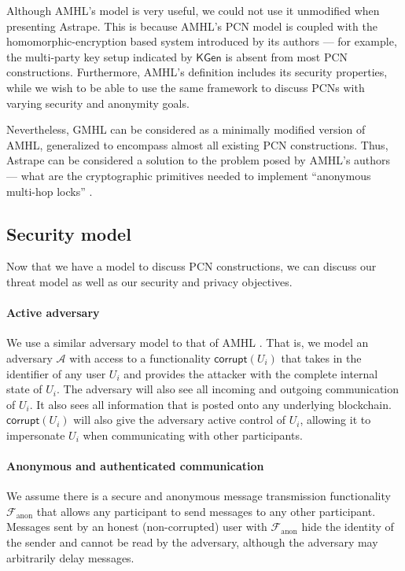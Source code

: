 \documentclass[USenglish,oneside,twocolumn]{article}
\begin{document}
Although AMHL's model is very useful, we could not use it unmodified when presenting Astrape. This is because AMHL's PCN model is coupled with the homomorphic-encryption based system introduced by its authors --- for example, the multi-party key setup indicated by $\mathsf{KGen}$ is absent from most PCN constructions. Furthermore, AMHL's definition includes its security properties, while we wish to be able to use the same framework to discuss PCNs with varying security and anonymity goals.

Nevertheless, GMHL can be considered as a minimally modified version of AMHL, generalized to encompass almost all existing PCN constructions. Thus, Astrape can be considered a solution to the problem posed by AMHL's authors --- what are the cryptographic primitives needed to implement ``anonymous multi-hop locks'' \cite{malavolta2019anonymous}.

\subsection{Security model}

Now that we have a model to discuss PCN constructions, we can discuss our threat model as well as our security and privacy objectives.


\paragraph*{Active adversary} We use a similar adversary model to that of AMHL \cite{malavolta2019anonymous}. That is, we model an adversary $\mathcal{A}$ with access to a functionality $\mathsf{corrupt}(U_i)$ that takes in the identifier of any user $U_i$ and provides the attacker with the complete internal state of $U_i$. The adversary will also see all incoming and outgoing communication of $U_i$. It also sees all information that is posted onto any underlying blockchain. $\mathsf{corrupt}(U_i)$ will also give the adversary active control of $U_i$, allowing it to impersonate $U_i$ when communicating with other participants.

\newcommand{\Fanon}{\mathcal{F}_\mathrm{anon}}

\paragraph*{Anonymous and authenticated communication} We assume there is a secure and anonymous message transmission functionality $\Fanon$ that allows any participant to send messages to any other participant. Messages sent by an honest (non-corrupted) user with $\Fanon$ hide the identity of the sender and cannot be read by the adversary, although the adversary may arbitrarily delay messages.
\end{document}
